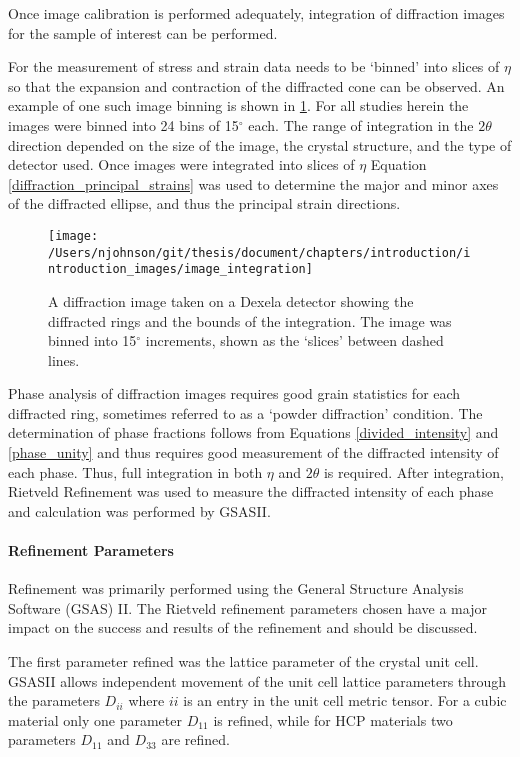 Once image calibration is performed adequately, integration of diffraction images for the sample of interest can be performed.

For the measurement of stress and strain data needs to be `binned' into slices of $\eta$ so that the expansion and contraction of the diffracted cone can be observed. An example of one such image binning is shown in \ref{image_integration}. For all studies herein the images were binned into 24 bins of 15$^\circ$ each. The range of integration in the $2\theta$ direction depended on the size of the image, the crystal structure, and the type of detector used. Once images were integrated into slices of $\eta$ Equation \ref{diffraction_principal_strains} was used to determine the major and minor axes of the diffracted ellipse, and thus the principal strain directions.

\begin{figure}
	\texttt{[image: /Users/njohnson/git/thesis/document/chapters/introduction/introduction\_images/image\_integration]}
	\caption{A diffraction image taken on a Dexela detector showing the diffracted rings and the bounds of the integration. The image was binned into 15$^\circ$ increments, shown as the `slices' between dashed lines.}
	\label{image_integration}
\end{figure}

Phase analysis of diffraction images requires good grain statistics for each diffracted ring, sometimes referred to as a `powder diffraction' condition. The determination of phase fractions follows from Equations \ref{divided_intensity} and \ref{phase_unity} and thus requires good measurement of the diffracted intensity of each phase. Thus, full integration in both $\eta$ and $2\theta$ is required. After integration, Rietveld Refinement was used to measure the diffracted intensity of each phase and calculation was performed by GSASII. 

\paragraph{Refinement Parameters}
Refinement was primarily performed using the General Structure Analysis Software (GSAS) II. The Rietveld refinement parameters chosen have a major impact on the success and results of the refinement and should be discussed.

The first parameter refined was the lattice parameter of the crystal unit cell. GSASII allows independent movement of the unit cell lattice parameters through the parameters $D_{ii}$ where $ii$ is an entry in the unit cell metric tensor. For a cubic material only one parameter $D_{11}$ is refined, while for HCP materials two parameters $D_{11}$ and $D_{33}$ are refined. 

